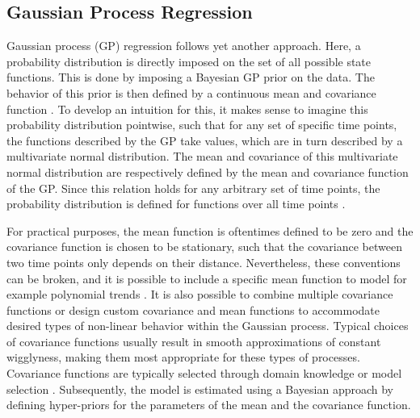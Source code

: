 \subsection{Gaussian Process Regression}

Gaussian process (GP) regression follows yet another approach. 
Here, a probability distribution is directly 
imposed on the set of all possible state functions. This is done by imposing 
a Bayesian GP prior on the data. The behavior of this 
prior is then defined by a continuous mean and covariance function 
\parencite{rasmussen_gaussian_2006, betancourt_robust_2020, 
roberts_gaussian_2013}. To develop an intuition for this, it makes sense to 
imagine this probability distribution pointwise, such that for any set of specific time points,
the functions described by the GP take values, which are in turn described by a multivariate normal distribution.
The mean and covariance of this multivariate normal distribution are respectively defined by the mean 
and covariance function of the GP. Since this relation holds for any arbitrary set of time points,
the probability distribution is defined for functions over all time points \parencite{rasmussen_gaussian_2006, 
betancourt_robust_2020, roberts_gaussian_2013}. 

For practical purposes, the mean function is oftentimes defined to be zero and the 
covariance function is chosen to be stationary, such that the covariance between 
two time points only depends on their distance. Nevertheless, these conventions 
can be broken, and it is possible to include a specific mean function to model 
for example polynomial trends \parencite{ohagan_curve_1978, hwang_how_2023, 
blight_bayesian_1975}. It is also possible to combine multiple covariance 
functions or design custom covariance and mean functions 
to accommodate desired types of non-linear behavior within the 
Gaussian process. Typical choices of covariance functions usually result 
in smooth approximations of constant wigglyness, making them most appropriate 
for these types of processes.
Covariance functions are typically selected through domain 
knowledge or model selection \parencite{richardson_gaussian_2017, 
abdessalem_automatic_2017}. Subsequently, the model is estimated using a Bayesian 
approach by defining hyper-priors for the parameters of the mean and the 
covariance function. 
